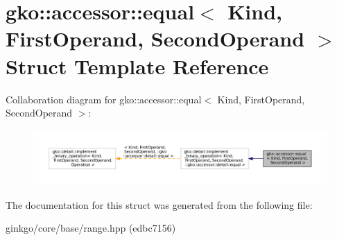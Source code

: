 \hypertarget{structgko_1_1accessor_1_1equal}{}\section{gko\+:\+:accessor\+:\+:equal$<$ Kind, First\+Operand, Second\+Operand $>$ Struct Template Reference}
\label{structgko_1_1accessor_1_1equal}


Collaboration diagram for gko\+:\+:accessor\+:\+:equal$<$ Kind, First\+Operand, Second\+Operand $>$\+:
\nopagebreak
\begin{figure}[H]
\begin{center}
\leavevmode
\includegraphics[width=350pt]{structgko_1_1accessor_1_1equal__coll__graph}
\end{center}
\end{figure}


The documentation for this struct was generated from the following file\+:\begin{DoxyCompactItemize}
\item 
ginkgo/core/base/range.\+hpp (edbc7156)\end{DoxyCompactItemize}
